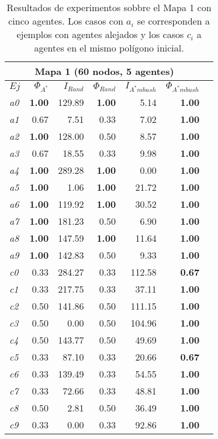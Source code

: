 \begin{table}[htb]
\begin{center}
\begin{tabular}{|l|r|r|r|r|r|r|}
\hline
\multicolumn{6}{|c|}{\textbf{Mapa 1 (60 nodos, 5 agentes)}}\\
\hline
$Ej$ & $\Phi_{A^*}$ & $I_{Rand}$ & $\Phi_{Rand}$
& $I_{A^*mbush}$ & $\Phi_{A^*mbush}$\\
\hline
\textit{a0} & \textbf{1.00} & 129.89 & \textbf{1.00} & 5.14 & \textbf{1.00} \\
\textit{a1} & 0.67 & 7.51 & 0.33 & 7.02 & \textbf{1.00} \\
\textit{a2} & \textbf{1.00} & 128.00 & 0.50 & 8.57 & \textbf{1.00} \\
\textit{a3} & 0.67 & 18.55 & 0.33 & 9.98 & \textbf{1.00} \\
\textit{a4} & \textbf{1.00} & 289.28 & \textbf{1.00} & 0.00 & \textbf{1.00} \\
\textit{a5} & \textbf{1.00} & 1.06 & \textbf{1.00} & 21.72 & \textbf{1.00} \\
\textit{a6} & \textbf{1.00} & 119.92 & \textbf{1.00} & 30.52 & \textbf{1.00} \\
\textit{a7} & \textbf{1.00} & 181.23 & 0.50 & 6.90 & \textbf{1.00} \\
\textit{a8} & \textbf{1.00} & 147.59 & \textbf{1.00} & 11.64 & \textbf{1.00} \\
\textit{a9} & \textbf{1.00} & 142.83 & 0.50 & 9.33 & \textbf{1.00} \\
\textit{c0} & 0.33 & 284.27 & 0.33 & 112.58 & \textbf{0.67} \\
\hline
\hline
\textit{c1} & 0.33 & 217.75 & 0.33 & 37.11 & \textbf{1.00} \\
\textit{c2} & 0.50 & 141.86 & 0.50 & 111.15 & \textbf{1.00} \\
\textit{c3} & 0.50 & 0.00 & 0.50 & 104.96 & \textbf{1.00} \\
\textit{c4} & 0.50 & 143.77 & 0.50 & 49.69 & \textbf{1.00} \\
\textit{c5} & 0.33 & 87.10 & 0.33 & 20.66 & \textbf{0.67} \\
\textit{c6} & 0.33 & 139.49 & 0.33 & 54.55 & \textbf{1.00} \\
\textit{c7} & 0.33 & 72.66 & 0.33 & 48.81 & \textbf{1.00} \\
\textit{c8} & 0.50 & 2.81 & 0.50 & 36.49 & \textbf{1.00} \\
\textit{c9} & 0.33 & 0.00 & 0.33 & 92.86 & \textbf{1.00} \\
\hline
\end{tabular}
\end{center}
	\caption{\label{tab:exp3}
	     Resultados de experimentos sobbre el Mapa 1 con cinco agentes. Los casos
	     con $a_i$ se corresponden a ejemplos con agentes alejados
	     y los casos $c_i$ a agentes en el mismo polígono inicial.}
\end{table}
